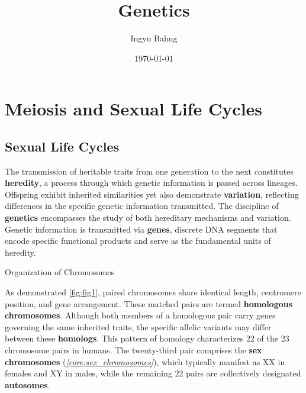 \documentclass[10pt]{article}
\title{Genetics}
\date{\today}
\author{Ingyu Bahng}
\begin{document}


\section{Meiosis and Sexual Life Cycles}

  \subsection{Sexual Life Cycles}

    The transmission of heritable traits from one generation to the next constitutes \textbf{heredity}, a process through which genetic information is passed across lineages. Offspring exhibit inherited similarities yet also demonstrate \textbf{variation}, reflecting differences in the specific genetic information transmitted. The discipline of \textbf{genetics} encompasses the study of both hereditary mechanisms and variation. Genetic information is transmitted via \textbf{genes}, discrete DNA segments that encode specific functional products and serve as the fundamental units of heredity.

    \begin{core}{Organization of Chromosomes}


      As demonstrated \autoref{fig:fig1}, paired chromosomes share identical length, centromere position, and gene arrangement. These matched pairs are termed \textbf{homologous chromosomes}. Although both members of a homologous pair carry genes governing the same inherited traits, the specific allelic variants may differ between these \textbf{homologs}. This pattern of homology characterizes 22 of the 23 chromosome pairs in humans. The twenty-third pair comprises the \textbf{sex chromosomes} (\textit{\autoref{core:sex_chromosomes}}), which typically manifest as XX in females and XY in males, while the remaining 22 pairs are collectively designated \textbf{autosomes}.

    \end{core}
\end{document}
